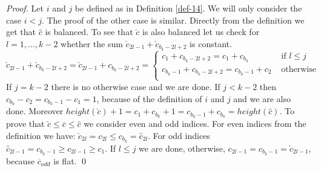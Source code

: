 \documentclass{llncs}
\begin{document}
\begin{proof}
Let $i$ and $j$ be defined as in Definition \ref{def-14}. We will only 
consider the case $i<j$. The proof of the other case is similar. Directly 
from the definition we get that $\hat{c}$ is balanced. To see that 
$\check{c}$ is also balanced let us check for $l=1,\ldots,k-2$ whether the 
sum $\check{c}_{2l-1} + \check{c}_{b_k-2l+2}$ is constant.
\[\check{c}_{2l-1} + \check{c}_{b_k-2l+2} = \check{c}_{2l-1} + c_{b_k-2l+2} = 
\left\{
\begin{array}{ll}
c_1 + c_{b_k-2l+2} = c_1 + c_{b_k}  & \mbox{ if } l\le j\\
c_{b_k-1} + c_{b_k-2l+2} = c_{b_k-1} + c_2 & \mbox{ otherwise }\\
\end{array}
\right.\]
If $j = k-2$ there is no otherwise case and we are done. If $j < k-2$ then 
$c_{b_k}-c_2 = c_{b_k-1}-c_1 = 1$, because of the definition of $i$ and $j$ 
and we are also done. Moreover $height(\check{c}) + 1 = c_1 + c_{b_k} +1 = 
c_{b_k-1} + c_{b_k} = height(\hat{c})$. To prove that $\check{c}\le 
\overline{c}\le \hat{c}$ we consider even and odd indices. For even indices 
from the definition we have: $\check{c}_{2l} = c_{2l} \le c_{b_k} = 
\hat{c}_{2l}$. For odd indices $\hat{c}_{2l-1} = c_{b_k-1} \ge c_{2l-1} \ge 
c_1$. If $l\le j$ we are done, otherwise, $c_{2l-1} = c_{b_k-1} = 
\check{c}_{2l-1}$, because $\overline{c}_{odd}$ is flat. \qed
\end{proof}
\end{document}
